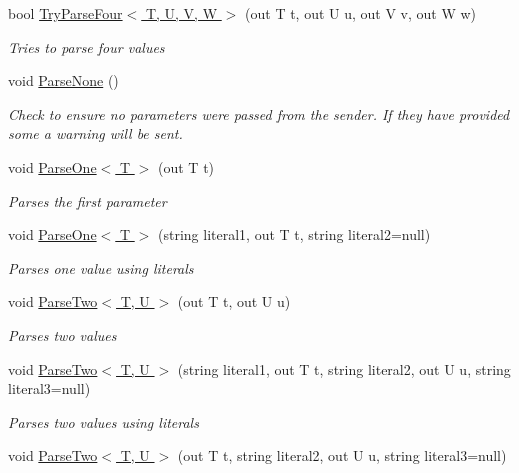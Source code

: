 \begin{DoxyCompactItemize}
bool \hyperlink{class_o_t_a_1_1_command_1_1_argument_list_a163beb9dfb81102554ab21d0110e4599}{Try\+Parse\+Four$<$ T, U, V, W $>$} (out T t, out U u, out V v, out W w)
\begin{DoxyCompactList}\small\item\em Tries to parse four values \end{DoxyCompactList}\item 
void \hyperlink{class_o_t_a_1_1_command_1_1_argument_list_ae55ffeb317707fb9fd16280bc9248931}{Parse\+None} ()
\begin{DoxyCompactList}\small\item\em Check to ensure no parameters were passed from the sender. If they have provided some a warning will be sent. \end{DoxyCompactList}\item 
void \hyperlink{class_o_t_a_1_1_command_1_1_argument_list_a19562f02632d010a2b04c773e46ef7c6}{Parse\+One$<$ T $>$} (out T t)
\begin{DoxyCompactList}\small\item\em Parses the first parameter \end{DoxyCompactList}\item 
void \hyperlink{class_o_t_a_1_1_command_1_1_argument_list_aed7fe7aa9366ffdb2b4b0f7cb5e1c706}{Parse\+One$<$ T $>$} (string literal1, out T t, string literal2=null)
\begin{DoxyCompactList}\small\item\em Parses one value using literals \end{DoxyCompactList}\item 
void \hyperlink{class_o_t_a_1_1_command_1_1_argument_list_aaaaf2e861fa297cbe6d70f1665a6c65c}{Parse\+Two$<$ T, U $>$} (out T t, out U u)
\begin{DoxyCompactList}\small\item\em Parses two values \end{DoxyCompactList}\item 
void \hyperlink{class_o_t_a_1_1_command_1_1_argument_list_a88684ed427e60c79beb51e593a817271}{Parse\+Two$<$ T, U $>$} (string literal1, out T t, string literal2, out U u, string literal3=null)
\begin{DoxyCompactList}\small\item\em Parses two values using literals \end{DoxyCompactList}\item 
void \hyperlink{class_o_t_a_1_1_command_1_1_argument_list_a2139de8a081b9e2e7b34988abd6c07a1}{Parse\+Two$<$ T, U $>$} (out T t, string literal2, out U u, string literal3=null)

\end{DoxyCompactItemize}
